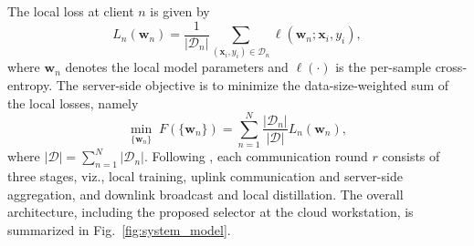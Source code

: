 \documentclass[journal]{IEEEtran}
\begin{document}
The local loss at client $n$ is given by
\begin{equation}
L_n(\bm{w}_n) = \frac{1}{|\mathcal{D}_n|} \sum_{(\bm{x}_i, y_i) \in \mathcal{D}_n} \ell(\bm{w}_n; \bm{x}_i, y_i),
\label{eq:local_loss}
\end{equation}
where $\bm{w}_n$ denotes the local model parameters and $\ell(\cdot)$ is the per-sample cross-entropy. The server-side objective is to minimize the data-size-weighted sum of the local losses, namely
\begin{equation}
\min_{\{\bm{w}_n\}} \; F\!\left(\{\bm{w}_n\}\right) = \sum_{n=1}^{N} \frac{|\mathcal{D}_n|}{|\mathcal{D}|} L_n(\bm{w}_n),
\label{eq:global_obj}
\end{equation}
where $|\mathcal{D}| = \sum_{n=1}^{N} |\mathcal{D}_n|$. Following \cite{mu2024fedtskd}, each communication round $r$ consists of three stages, viz., local training, uplink communication and server-side aggregation, and downlink broadcast and local distillation. The overall architecture, including the proposed selector at the cloud workstation, is summarized in Fig.~\ref{fig:system_model}.
\end{document}

